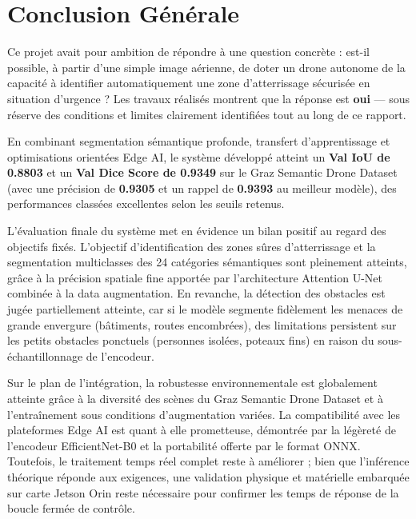 \chapter*{Conclusion Générale}

Ce projet avait pour ambition de répondre à une question concrète : est-il possible, à partir d'une simple image aérienne, de doter un drone autonome de la capacité à identifier automatiquement une zone d'atterrissage sécurisée en situation d'urgence ? Les travaux réalisés montrent que la réponse est \textbf{oui} — sous réserve des conditions et limites clairement identifiées tout au long de ce rapport.

En combinant segmentation sémantique profonde, transfert d'apprentissage et optimisations orientées Edge AI, le système développé atteint un \textbf{Val IoU de 0.8803} et un \textbf{Val Dice Score de 0.9349} sur le Graz Semantic Drone Dataset (avec une précision de \textbf{0.9305} et un rappel de \textbf{0.9393} au meilleur modèle), des performances classées excellentes selon les seuils retenus.

L'évaluation finale du système met en évidence un bilan positif au regard des objectifs fixés. L'objectif d'identification des zones sûres d'atterrissage et la segmentation multiclasses des 24 catégories sémantiques sont pleinement atteints, grâce à la précision spatiale fine apportée par l'architecture Attention U-Net combinée à la data augmentation. En revanche, la détection des obstacles est jugée partiellement atteinte, car si le modèle segmente fidèlement les menaces de grande envergure (bâtiments, routes encombrées), des limitations persistent sur les petits obstacles ponctuels (personnes isolées, poteaux fins) en raison du sous-échantillonnage de l'encodeur.

Sur le plan de l'intégration, la robustesse environnementale est globalement atteinte grâce à la diversité des scènes du Graz Semantic Drone Dataset et à l'entraînement sous conditions d'augmentation variées. La compatibilité avec les plateformes Edge AI est quant à elle prometteuse, démontrée par la légèreté de l'encodeur EfficientNet-B0 et la portabilité offerte par le format ONNX. Toutefois, le traitement temps réel complet reste à améliorer ; bien que l'inférence théorique réponde aux exigences, une validation physique et matérielle embarquée sur carte Jetson Orin reste nécessaire pour confirmer les temps de réponse de la boucle fermée de contrôle.

